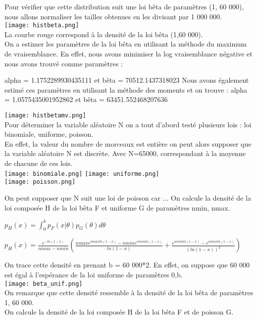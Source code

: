 \documentclass{book}
\begin{document}
Pour vérifier que cette distribution suit une loi bêta de paramètres (1, 60 000), nous allons normaliser les tailles obtenues en les divisant par 1 000 000.\\
\texttt{[image: histbeta.png]}\\
La courbe rouge correspond à la densité de la loi bêta (1,60 000).\\
On a estimer les paramètres de la loi bêta en utilisant la méthode du maximum de vraisemblance. En effet, nous avons minimiser la log vraisemblance négative et nous avons trouvé comme paramètres : 

alpha = 1.1752289930435111 et bêta = 70512.1437318023
Nous avons également estimé ces paramètres en utilisant la méthode des moments et on trouve : 
alpha = 1.0575435001952862 et bêta = 63451.552468207636

\texttt{[image: histbetamv.png]}\\
Pour déterminer la variable aléatoire N on a tout d'abord testé plusieurs lois : loi binomiale, uniforme, poisson. \\
En effet, la valeur du nombre de morceaux est entière on peut alors supposer que la variable aléatoire N est discrète.
Avec N=65000, correspondant à la moyenne de chacune de ces lois.
\\
\texttt{[image: binomiale.png]}
\texttt{[image: uniforme.png]}\\
\texttt{[image: poisson.png]}

On peut supposer que N suit une loi de poisson car ...
On calcule la densité de la loi composée H de la loi bêta F et uniforme G de paramètres nmin, nmax.

$p_{H}(x) = \int_{0}^{b} p_{F}(x|\theta) p_{G}(\theta)d\theta$

$p_{H}(x) = \frac{e^{-ln(1-x)}}{nmax-nmin}(\frac{nmaxe^{nmaxln(1-x)}-nmine^{nminln(1-x)}}{ln(1-x)}+\frac{e^{nminln(1-x)}-e^{nmaxln(1-x)}}{(ln(1-x))^2})$



On trace cette densité en prenant b = 60 000*2.
En effet, on suppose que 60 000 est égal à l'espérance de la loi uniforme de paramètres 0,b.\\
\texttt{[image: beta\_unif.png]}\\
On remarque que cette densité ressemble à la densité de la loi bêta de paramètres 1, 60 000. \\
On calcule la densité de la loi composée H de la loi bêta F et de poisson G.
\end{document}
